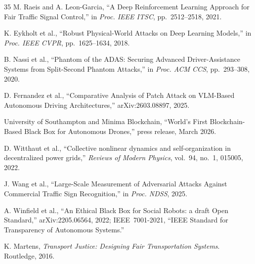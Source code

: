 \documentclass[sigconf,nonacm]{acmart}
\begin{document}
\begin{thebibliography}{35}
M. Raeis and A. Leon-Garcia, ``A Deep Reinforcement Learning Approach for Fair Traffic Signal Control,'' in \textit{Proc. IEEE ITSC}, pp.~2512--2518, 2021.

K. Eykholt et al., ``Robust Physical-World Attacks on Deep Learning Models,'' in \textit{Proc. IEEE CVPR}, pp.~1625--1634, 2018.

B. Nassi et al., ``Phantom of the ADAS: Securing Advanced Driver-Assistance Systems from Split-Second Phantom Attacks,'' in \textit{Proc. ACM CCS}, pp.~293--308, 2020.

D. Fernandez et al., ``Comparative Analysis of Patch Attack on VLM-Based Autonomous Driving Architectures,'' arXiv:2603.08897, 2025.

University of Southampton and Minima Blockchain, ``World's First Blockchain-Based Black Box for Autonomous Drones,'' press release, March 2026.

D. Witthaut et al., ``Collective nonlinear dynamics and self-organization in decentralized power grids,'' \textit{Reviews of Modern Physics}, vol.~94, no.~1, 015005, 2022.

J. Wang et al., ``Large-Scale Measurement of Adversarial Attacks Against Commercial Traffic Sign Recognition,'' in \textit{Proc. NDSS}, 2025.

A. Winfield et al., ``An Ethical Black Box for Social Robots: a draft Open Standard,'' arXiv:2205.06564, 2022; IEEE~7001-2021, ``IEEE Standard for Transparency of Autonomous Systems.''

K. Martens, \textit{Transport Justice: Designing Fair Transportation Systems}. Routledge, 2016.

\end{thebibliography}
\end{document}
